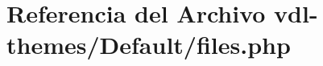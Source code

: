 \hypertarget{files_8php}{\section{Referencia del Archivo vdl-\/themes/\-Default/files.php}
\label{files_8php}
}
